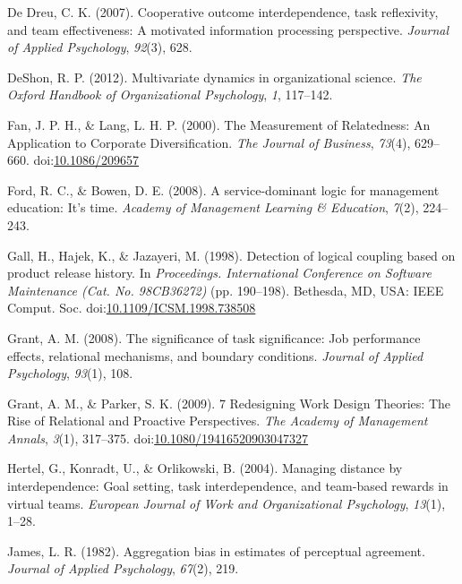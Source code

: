 \documentclass[english,,man]{apa6}
\theoremstyle{definition}
\theoremstyle{definition}
\theoremstyle{definition}
\theoremstyle{remark}
\begin{document}
\leavevmode\hypertarget{ref-de_dreu_cooperative_2007}{}%
De Dreu, C. K. (2007). Cooperative outcome interdependence, task
reflexivity, and team effectiveness: A motivated information processing
perspective. \emph{Journal of Applied Psychology}, \emph{92}(3), 628.

\leavevmode\hypertarget{ref-deshon_multivariate_2012}{}%
DeShon, R. P. (2012). Multivariate dynamics in organizational science.
\emph{The Oxford Handbook of Organizational Psychology}, \emph{1},
117--142.

\leavevmode\hypertarget{ref-fan_measurement_2000}{}%
Fan, J. P. H., \& Lang, L. H. P. (2000). The Measurement of Relatedness:
An Application to Corporate Diversification. \emph{The Journal of
Business}, \emph{73}(4), 629--660.
doi:\href{https://doi.org/10.1086/209657}{10.1086/209657}

\leavevmode\hypertarget{ref-ford_service-dominant_2008}{}%
Ford, R. C., \& Bowen, D. E. (2008). A service-dominant logic for
management education: It's time. \emph{Academy of Management Learning \&
Education}, \emph{7}(2), 224--243.

\leavevmode\hypertarget{ref-gall_detection_1998}{}%
Gall, H., Hajek, K., \& Jazayeri, M. (1998). Detection of logical
coupling based on product release history. In \emph{Proceedings.
International Conference on Software Maintenance (Cat. No. 98CB36272)}
(pp. 190--198). Bethesda, MD, USA: IEEE Comput. Soc.
doi:\href{https://doi.org/10.1109/ICSM.1998.738508}{10.1109/ICSM.1998.738508}

\leavevmode\hypertarget{ref-grant_significance_2008}{}%
Grant, A. M. (2008). The significance of task significance: Job
performance effects, relational mechanisms, and boundary conditions.
\emph{Journal of Applied Psychology}, \emph{93}(1), 108.

\leavevmode\hypertarget{ref-grant_7_2009}{}%
Grant, A. M., \& Parker, S. K. (2009). 7 Redesigning Work Design
Theories: The Rise of Relational and Proactive Perspectives. \emph{The
Academy of Management Annals}, \emph{3}(1), 317--375.
doi:\href{https://doi.org/10.1080/19416520903047327}{10.1080/19416520903047327}

\leavevmode\hypertarget{ref-hertel_managing_2004}{}%
Hertel, G., Konradt, U., \& Orlikowski, B. (2004). Managing distance by
interdependence: Goal setting, task interdependence, and team-based
rewards in virtual teams. \emph{European Journal of Work and
Organizational Psychology}, \emph{13}(1), 1--28.

\leavevmode\hypertarget{ref-james_aggregation_1982}{}%
James, L. R. (1982). Aggregation bias in estimates of perceptual
agreement. \emph{Journal of Applied Psychology}, \emph{67}(2), 219.
\end{document}
